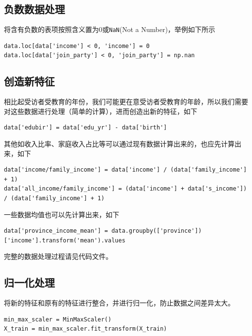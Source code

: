 \documentclass[logo,reportComp]{thesis}
\begin{document}
\subsection{负数数据处理}
将含有负数的表项按照含义置为0或\verb'NaN'(Not a Number)，举例如下所示
\begin{lstlisting}
data.loc[data['income'] < 0, 'income'] = 0
data.loc[data['join_party'] < 0, 'join_party'] = np.nan
\end{lstlisting}

\subsection{创造新特征}
相比起受访者受教育的年份，我们可能更在意受访者受教育的年龄，所以我们需要对这些数据进行处理（简单的计算），进而创造出新的特征，如下
\begin{lstlisting}
data['edubir'] = data['edu_yr'] - data['birth']
\end{lstlisting}

其他如收入比率、家庭收入占比等可以通过现有数据计算出来的，也应先计算出来，如下
\begin{lstlisting}
data['income/family_income'] = data['income'] / (data['family_income'] + 1)
data['all_income/family_income'] = (data['income'] + data['s_income']) / (data['family_income'] + 1)
\end{lstlisting}

一些数据均值也可以先计算出来，如下
\begin{lstlisting}
data['province_income_mean'] = data.groupby(['province'])['income'].transform('mean').values
\end{lstlisting}

完整的数据处理过程请见代码文件。

\subsection{归一化处理}
将新的特征和原有的特征进行整合，并进行归一化，防止数据之间差异太大。
\begin{lstlisting}
min_max_scaler = MinMaxScaler()
X_train = min_max_scaler.fit_transform(X_train)
\end{lstlisting}
\end{document}
